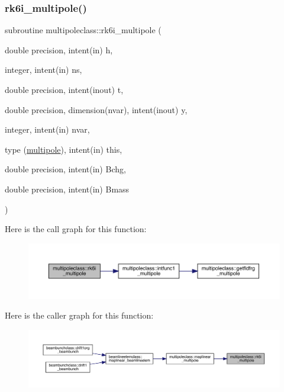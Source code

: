 \subsubsection{\texorpdfstring{rk6i\_multipole()}{rk6i\_multipole()}}
{\footnotesize\ttfamily subroutine multipoleclass\+::rk6i\+\_\+multipole (\begin{DoxyParamCaption}\item[{double precision, intent(in)}]{h,  }\item[{integer, intent(in)}]{ns,  }\item[{double precision, intent(inout)}]{t,  }\item[{double precision, dimension(nvar), intent(inout)}]{y,  }\item[{integer, intent(in)}]{nvar,  }\item[{type (\mbox{\hyperlink{namespacemultipoleclass_structmultipoleclass_1_1multipole}{multipole}}), intent(in)}]{this,  }\item[{double precision, intent(in)}]{Bchg,  }\item[{double precision, intent(in)}]{Bmass }\end{DoxyParamCaption})}

Here is the call graph for this function\+:\nopagebreak
\begin{figure}[H]
\begin{center}
\leavevmode
\includegraphics[width=350pt]{namespacemultipoleclass_aebbed53759ae97dc55df35264c89274c_cgraph}
\end{center}
\end{figure}
Here is the caller graph for this function\+:\nopagebreak
\begin{figure}[H]
\begin{center}
\leavevmode
\includegraphics[width=350pt]{namespacemultipoleclass_aebbed53759ae97dc55df35264c89274c_icgraph}
\end{center}
\end{figure}
\mbox{\label{namespacemultipoleclass_a85869614f5049e8bb17c4f195011fca5}} 

